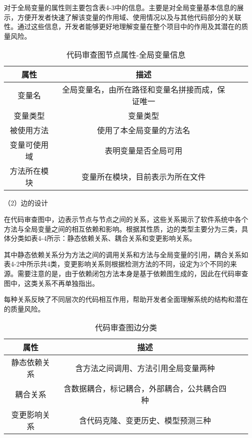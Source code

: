对于全局变量的属性则主要包含表4-3中的信息。主要是对全局变量基本信息的展示，方便开发者快速了解该变量的作用域、使用情况以及与其他代码部分的关联性。通过这些信息，开发者能够更好地理解变量在整个项目中的作用及其潜在的质量风险。

\begin{table}[htbp]
\caption{代码审查图节点属性-全局变量信息}
\vspace{0.5em}\centering\wuhao
\begin{tabular}{cccc}
\toprule
    属性 & 描述 \\
\midrule
变量名 & 全局变量名，由所在路径和变量名拼接而成，保证唯一  \\
变量类型 & 变量类型   \\
被使用方法 & 使用了本全局变量的方法名   \\
变量可使用域 & 表明变量是否全局可用   \\
方法所在模块 &  变量所在模块，目前表示为所在文件  \\  
\bottomrule
\end{tabular}
\end{table}


（2）边的设计

在代码审查图中，边表示节点与节点之间的关系，这些关系揭示了软件系统中各个方法与全局变量之间的相互依赖和影响。根据其性质，边的类型主要分为三类，具体分类如表4-4所示：静态依赖关系、耦合关系和变更影响关系。

其中静态依赖关系分为方法之间的调用关系和方法与全局变量的引用，耦合关系如表4-2中所示共4类，变更影响关系则根据检测方法的不同，设定为3个不同的来源。需要注意的是，由于依赖闭包方法本身是基于依赖图生成的，因此在代码审查图中，这类关系不再单独指出。

每种关系反映了不同层次的代码相互作用，帮助开发者全面理解系统的结构和潜在的质量风险。

\begin{table}[htbp]
\caption{代码审查图边分类}
\vspace{0.5em}\centering\wuhao
\begin{tabular}{cccc}
\toprule
属性 & 描述 \\
\midrule
静态依赖关系 & 含方法之间调用、方法引用全局变量两种  \\
耦合关系 & 含数据耦合，标记耦合，外部耦合，公共耦合四种   \\
变更影响关系 & 含代码克隆、变更历史、模型预测三种  \\
\bottomrule
\end{tabular}
\end{table}



